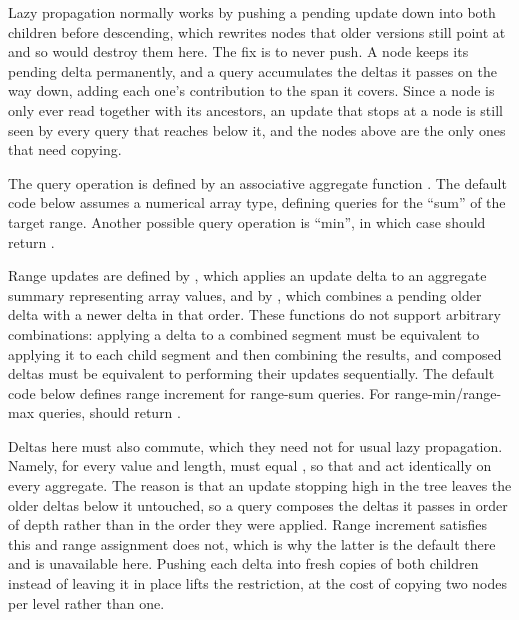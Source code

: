 Lazy propagation normally works by pushing a pending update down into both children before descending, which rewrites nodes that older versions still point at and so would destroy them here. The fix is to never push. A node keeps its pending delta permanently, and a query accumulates the deltas it passes on the way down, adding each one's contribution to the span it covers. Since a node is only ever read together with its ancestors, an update that stops at a node is still seen by every query that reaches below it, and the nodes above are the only ones that need copying.

The query operation is defined by an associative aggregate function . The default code below assumes a numerical array type, defining queries for the ``sum'' of the target range. Another possible query operation is ``min'', in which case  should return .

Range updates are defined by , which applies an update delta  to an aggregate summary  representing  array values, and by , which combines a pending older delta with a newer delta in that order. These functions do not support arbitrary combinations: applying a delta to a combined segment must be equivalent to applying it to each child segment and then combining the results, and composed deltas must be equivalent to performing their updates sequentially. The default code below defines range increment for range-sum queries. For range-min/range-max queries,  should return .

Deltas here must also commute, which they need not for usual lazy propagation. Namely, for every value and length,  must equal , so that  and  act identically on every aggregate. The reason is that an update stopping high in the tree leaves the older deltas below it untouched, so a query composes the deltas it passes in order of depth rather than in the order they were applied. Range increment satisfies this and range assignment does not, which is why the latter is the default there and is unavailable here. Pushing each delta into fresh copies of both children instead of leaving it in place lifts the restriction, at the cost of copying two nodes per level rather than one.

